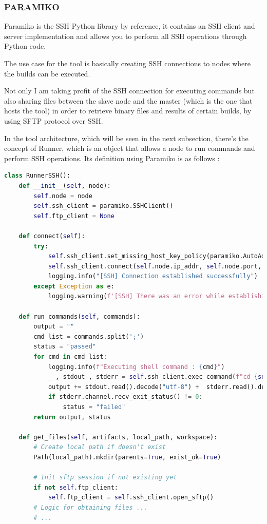 \documentclass{article}
\begin{document}
\subsubsection{PARAMIKO}

Paramiko is the \gls{SSH} Python library by reference, it contains an SSH client and server implementation and allows you to perform all SSH operations through Python code.

The use case for the tool is basically creating SSH connections to nodes where the builds can be executed.

Not only I am taking profit of the SSH connection for executing commands but also sharing files between the slave node and the master (which is the one that hosts the tool) in order to retrieve binary files and results of certain builds, by using SFTP protocol over SSH.

In the tool architecture, which will be seen in the next subsection, there's the concept of Runner, which is an object that allows a node to run commands and perform SSH operations. Its definition using Paramiko is as follows : 


\begin{lstlisting}[language=Python]
class RunnerSSH():
    def __init__(self, node):
        self.node = node
        self.ssh_client = paramiko.SSHClient()
        self.ftp_client = None

    def connect(self):
        try:
            self.ssh_client.set_missing_host_key_policy(paramiko.AutoAddPolicy)
            self.ssh_client.connect(self.node.ip_addr, self.node.port, self.node.user, self.node.password)
            logging.info("[SSH] Connection established successfully")
        except Exception as e:
            logging.warning(f'[SSH] There was an error while establishing connection {e}')

    def run_commands(self, commands):
        output = ""
        cmd_list = commands.split(';')
        status = "passed"
        for cmd in cmd_list:
            logging.info(f"Executing shell command : {cmd}")
            _ , stdout , stderr = self.ssh_client.exec_command(f"cd {self.node.workspace};{cmd}")
            output += stdout.read().decode("utf-8") +  stderr.read().decode("utf-8") + '\n'
            if stderr.channel.recv_exit_status() != 0:
                status = "failed"
        return output, status

    def get_files(self, artifacts, local_path, workspace):
        # Create local path if doesn't exist
        Path(local_path).mkdir(parents=True, exist_ok=True)

        # Init sftp session if not existing yet
        if not self.ftp_client:
            self.ftp_client = self.ssh_client.open_sftp()
        # Logic for obtaining files ...
        # ...

\end{lstlisting}
\end{document}
